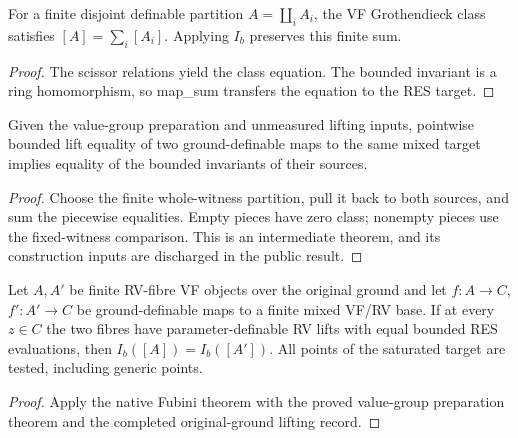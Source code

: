 \begin{lemma}
\label{additivity}
\leanok
{}
For a finite disjoint definable partition $A=\coprod_i A_i$, the VF Grothendieck class satisfies $[A]=\sum_i[A_i]$. Applying $I_b$ preserves this finite sum.
\end{lemma}

\begin{proof}
The scissor relations yield the class equation. The bounded invariant is a ring homomorphism, so map_sum transfers the equation to the RES target.
\end{proof}

\begin{theorem}
\label{native}
\leanok
{}
Given the value-group preparation and unmeasured lifting inputs, pointwise bounded lift equality of two ground-definable maps to the same mixed target implies equality of the bounded invariants of their sources.
\end{theorem}

\begin{proof}
Choose the finite whole-witness partition, pull it back to both sources, and sum the piecewise equalities. Empty pieces have zero class; nonempty pieces use the fixed-witness comparison. This is an intermediate theorem, and its construction inputs are discharged in the public result.
\end{proof}

\begin{theorem}
\label{main}
\leanok
{}
Let $A,A'$ be finite RV-fibre VF objects over the original ground and let $f:A\to C$, $f':A'\to C$ be ground-definable maps to a finite mixed VF/RV base. If at every $z\in C$ the two fibres have parameter-definable RV lifts with equal bounded RES evaluations, then $I_b([A])=I_b([A'])$. All points of the saturated target are tested, including generic points.
\end{theorem}

\begin{proof}
Apply the native Fubini theorem with the proved value-group preparation theorem and the completed original-ground lifting record.
\end{proof}

